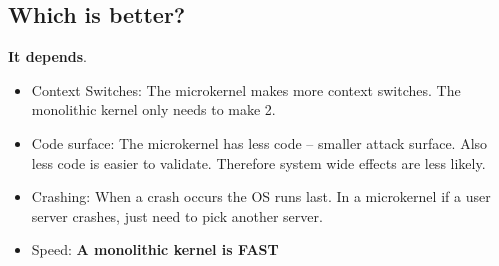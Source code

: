 \documentclass[../base_file/cs1550_notes.tex]{subfiles}
\begin{document}
\subsection{Which is better?}
\textbf{It depends}.
	\begin{itemize}	
	\item Context Switches: The microkernel makes more context switches.  The monolithic kernel only needs
			to make 2.
	\item Code surface: The microkernel has less code -- smaller attack surface.  Also less code is easier
		    to validate.  Therefore system wide effects are less likely.
	\item Crashing: When a crash occurs the OS runs last.  In a microkernel if a user server crashes, just
			need to pick another server.
	\item Speed: \textbf{A monolithic kernel is FAST}	
	\end{itemize}
\end{document}
